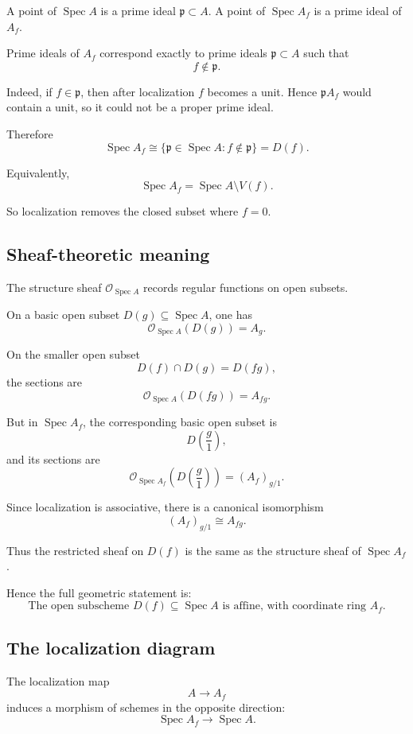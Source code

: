 \documentclass[12pt,a4paper]{article}
\newcommand{\OO}{\mathcal{O}}
\newcommand{\Spec}{\operatorname{Spec}}
\theoremstyle{notespace}
\begin{document}
A point of \(\Spec A\) is a prime ideal \(\mathfrak p\subset A\). A point of \(\Spec A_f\) is a prime ideal of \(A_f\).

Prime ideals of \(A_f\) correspond exactly to prime ideals \(\mathfrak p\subset A\) such that
\[
f\notin\mathfrak p.
\]

Indeed, if \(f\in\mathfrak p\), then after localization \(f\) becomes a unit. Hence \(\mathfrak pA_f\) would contain a unit, so it could not be a proper prime ideal.

Therefore
\[
\Spec A_f
\cong
\{\mathfrak p\in\Spec A:f\notin\mathfrak p\}
=
D(f).
\]

Equivalently,
\[
\boxed{
	\Spec A_f=\Spec A\setminus V(f).
}
\]

So localization removes the closed subset where \(f=0\).

\subsection{Sheaf-theoretic meaning}

The structure sheaf \(\OO_{\Spec A}\) records regular functions on open subsets.

On a basic open subset \(D(g)\subseteq\Spec A\), one has
\[
\OO_{\Spec A}(D(g))=A_g.
\]

On the smaller open subset
\[
D(f)\cap D(g)=D(fg),
\]
the sections are
\[
\OO_{\Spec A}(D(fg))=A_{fg}.
\]

But in \(\Spec A_f\), the corresponding basic open subset is
\[
D\left(\frac g1\right),
\]
and its sections are
\[
\OO_{\Spec A_f}\left(D\left(\frac g1\right)\right)
=
(A_f)_{g/1}.
\]

Since localization is associative, there is a canonical isomorphism
\[
(A_f)_{g/1}\cong A_{fg}.
\]

Thus the restricted sheaf on \(D(f)\) is the same as the structure sheaf of \(\Spec A_f\).

Hence the full geometric statement is:
\[
\boxed{
	\text{The open subscheme }D(f)\subseteq\Spec A
	\text{ is affine, with coordinate ring }A_f.
}
\]

\subsection{The localization diagram}

The localization map
\[
A\longrightarrow A_f
\]
induces a morphism of schemes in the opposite direction:
\[
\Spec A_f\longrightarrow \Spec A.
\]
\end{document}

